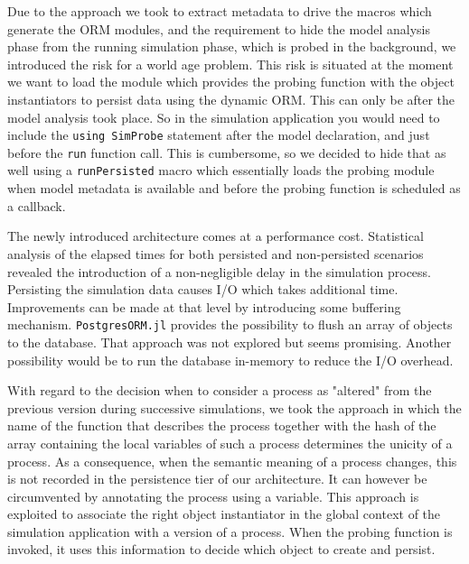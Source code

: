 \documentclass{juliacon}
\begin{document}
Due to the approach we took to extract metadata to drive the macros which generate the ORM modules, and the requirement to hide the model analysis phase from the running simulation phase, which is probed in the background, we introduced the risk for a world age problem. This risk is situated at the moment we want to load the module which provides the probing function with the object instantiators to persist data using the dynamic ORM. This can only be after the model analysis took place. So in the simulation application you would need to include the \texttt{using SimProbe} statement after the model declaration, and just before the \texttt{run} function call. This is cumbersome, so we decided to hide that as well using a \texttt{runPersisted} macro which essentially loads the probing module when model metadata is available and before the probing function is scheduled as a callback.\vskip 6pt

The newly introduced architecture comes at a performance cost. Statistical analysis of the elapsed times for both persisted and non-persisted scenarios revealed the introduction of a non-negligible delay in the simulation process. Persisting the simulation data causes I/O which takes additional time. Improvements can be made at that level by introducing some buffering mechanism. \texttt{PostgresORM.jl} provides the possibility to flush an array of objects to the database. That approach was not explored but seems promising. Another possibility would be to run the database in-memory to reduce the I/O overhead. \vskip 6pt

With regard to the decision when to consider a process as "altered" from the previous version during successive simulations, we took the approach in which the name of the function that describes the process together with the hash of the array containing the local variables of such a process determines the unicity of a process. As a consequence, when the semantic meaning of a process changes, this is not recorded in the persistence tier of our architecture. It can however be circumvented by annotating the process using a variable. This approach is exploited to associate the right object instantiator in the global context of the simulation application with a version of a process. When the probing function is invoked, it uses this information to decide which object to create and persist.\vskip 6pt
\end{document}
